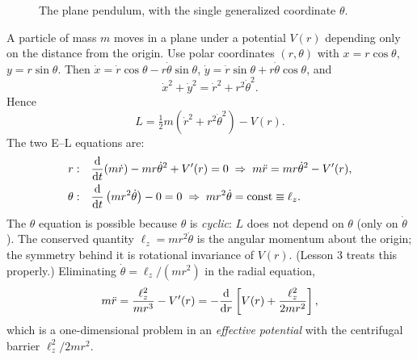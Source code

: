\documentclass[11pt]{article}
\begin{document}
\begin{figure}[ht]
\centering
{}
\caption{The plane pendulum, with the single generalized coordinate $\theta$.}
\end{figure}

\begin{example}
A particle of mass $m$ moves in a plane under a potential $V(r)$ depending only on the distance from the origin. Use polar coordinates $(r,\theta)$ with $x=r\cos\theta$, $y=r\sin\theta$. Then $\dot x=\dot r\cos\theta-r\dot\theta\sin\theta$, $\dot y=\dot r\sin\theta+r\dot\theta\cos\theta$, and
\[
  \dot x^2+\dot y^2=\dot r^2+r^2\dot\theta^2 .
\]
Hence
\begin{equation}
  L=\tfrac12m\left(\dot r^2+r^2\dot\theta^2\right)-V(r).
\end{equation}
The two E--L equations are:
\begin{align}
  r:&\quad \frac{\mathrm{d} }{\mathrm{d} t}(m\dot r)-mr\dot\theta^2+V'(r)=0\;\Rightarrow\; m\ddot r=mr\dot\theta^2-V'(r),\\
  \theta:&\quad \frac{\mathrm{d} }{\mathrm{d} t}\left(mr^2\dot\theta\right)-0=0\;\Rightarrow\; mr^2\dot\theta=\text{const}\equiv \ell_z .
\end{align}
The $\theta$ equation is possible because $\theta$ is \emph{cyclic}: $L$ does not depend on $\theta$ (only on $\dot\theta$). The conserved quantity $\ell_z=mr^2\dot\theta$ is the angular momentum about the origin; the symmetry behind it is rotational invariance of $V(r)$. (Lesson 3 treats this properly.) Eliminating $\dot\theta=\ell_z/(mr^2)$ in the radial equation,
\begin{equation}
  m\ddot r=\frac{\ell_z^2}{mr^3}-V'(r)=-\frac{\mathrm{d} }{\mathrm{d} r}\left[V(r)+\frac{\ell_z^2}{2mr^2}\right],
\end{equation}
which is a one-dimensional problem in an \emph{effective potential} with the centrifugal barrier $\ell_z^2/2mr^2$.
\end{example}
\end{document}
